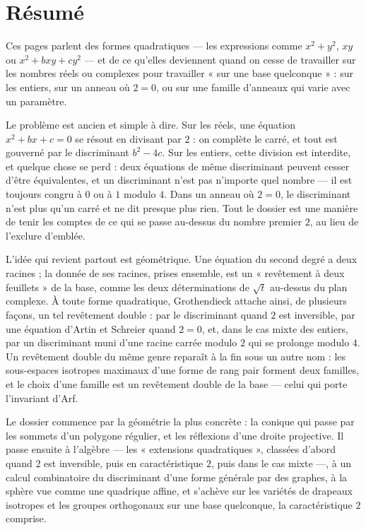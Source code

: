 \documentclass[11pt,a4paper]{article}
\begin{document}
\section*{Résumé}

\begin{resume}
Ces pages parlent des formes quadratiques — les expressions comme $x^2 + y^2$,
$xy$ ou $x^2 + bxy + cy^2$ — et de ce qu'elles deviennent quand on cesse de
travailler sur les nombres réels ou complexes pour travailler « sur une base
quelconque » : sur les entiers, sur un anneau où $2 = 0$, ou sur une famille
d'anneaux qui varie avec un paramètre.

Le problème est ancien et simple à dire. Sur les réels, une équation
$x^2 + bx + c = 0$ se résout en divisant par $2$ : on complète le carré, et
tout est gouverné par le discriminant $b^2 - 4c$. Sur les entiers, cette
division est interdite, et quelque chose se perd : deux équations de même
discriminant peuvent cesser d'être équivalentes, et un discriminant n'est pas
n'importe quel nombre — il est toujours congru à $0$ ou à $1$ modulo $4$. Dans
un anneau où $2 = 0$, le discriminant n'est plus qu'un carré et ne dit presque
plus rien. Tout le dossier est une manière de tenir les comptes de ce qui se
passe au-dessus du nombre premier $2$, au lieu de l'exclure d'emblée.

L'idée qui revient partout est géométrique. Une équation du second degré a
deux racines ; la donnée de ses racines, prises ensemble, est un
« revêtement à deux feuillets » de la base, comme les deux déterminations de
$\sqrt{t}$ au-dessus du plan complexe. À toute forme quadratique,
Grothendieck attache ainsi, de plusieurs façons, un tel revêtement double :
par le discriminant quand $2$ est inversible, par une équation d'Artin et
Schreier quand $2 = 0$, et, dans le cas mixte des entiers, par un discriminant
muni d'une racine carrée modulo $2$ qui se prolonge modulo $4$. Un revêtement
double du même genre reparaît à la fin sous un autre nom : les sous-espaces
isotropes maximaux d'une forme de rang pair forment deux familles, et le choix
d'une famille est un revêtement double de la base — celui qui porte
l'invariant d'Arf.

Le dossier commence par la géométrie la plus concrète : la conique qui passe
par les sommets d'un polygone régulier, et les réflexions d'une droite
projective. Il passe ensuite à l'algèbre — les « extensions quadratiques »,
classées d'abord quand $2$ est inversible, puis en caractéristique $2$, puis
dans le cas mixte —, à un calcul combinatoire du discriminant d'une forme
générale par des graphes, à la sphère vue comme une quadrique affine, et
s'achève sur les variétés de drapeaux isotropes et les groupes orthogonaux
sur une base quelconque, la caractéristique $2$ comprise.


\end{resume}
\end{document}
